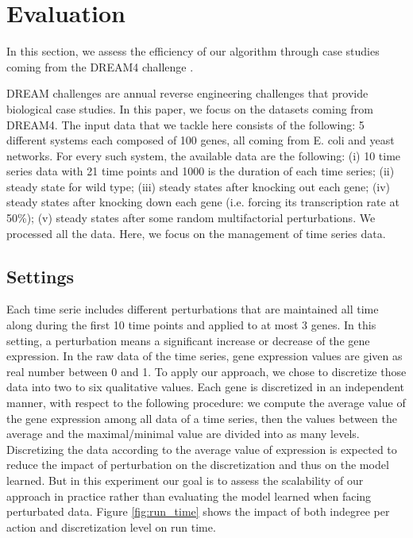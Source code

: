\section{Evaluation}
	\label{sec:evaluation}
	
	In this section, we assess the efficiency of our algorithm through case studies coming from the DREAM4 challenge \cite{prill2011crowdsourcing}.

	DREAM challenges are annual reverse engineering challenges that provide biological case studies.
	In this paper, we focus on the datasets coming from DREAM4.
	The input data that we tackle here consists of the following:
	5 different systems each composed of 100 genes, all coming from E. coli and yeast networks. For every such system,
	the available data are the following: (i) 10 time series data with 21 time points and 1000 is the duration of each time series; (ii) steady state for wild type;
	(iii) steady states after knocking out each gene;
	(iv) steady states after knocking down each gene (i.e. forcing its transcription rate at 50\%);
	(v) steady states after some random multifactorial perturbations. We processed all the data.
	Here, we focus on the management of time series data.

\subsection{Settings}

	Each time serie includes different perturbations that are maintained all time along during the first 10 time points and applied to at most 3 genes.
	In this setting, a perturbation means a significant increase or decrease of the gene expression.
	In the raw data of the time series, gene expression values are given as real number between 0 and 1.
	To apply our approach, we chose to discretize those data into two to six qualitative values.
	Each gene is discretized in an independent manner, with respect to the following procedure:
	we compute the average value of the gene expression among all data of a time series,
	then the values between the average and the maximal/minimal value are divided into as many levels.
	Discretizing the data according to the average value of expression is expected to reduce the impact of perturbation on the discretization and thus on the model learned.
	But in this experiment our goal is to assess the scalability of our approach in practice rather than evaluating the model learned when facing perturbated data.
	Figure \ref{fig:run_time} shows the impact of both indegree per action and discretization level on run time.

